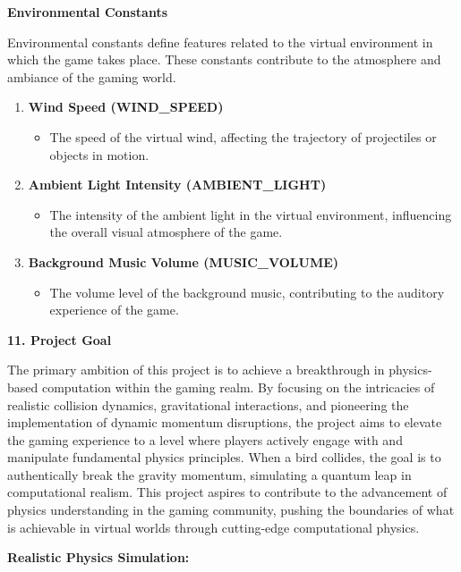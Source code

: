 \documentclass[
]{article}
\begin{document}
\textbf{Environmental Constants}

Environmental constants define features related to the virtual
environment in which the game takes place. These constants contribute to
the atmosphere and ambiance of the gaming world.

\begin{enumerate}
\def\labelenumi{\arabic{enumi}.}
\item
  \textbf{Wind Speed (WIND\_SPEED)}

  \begin{itemize}
  \item
    The speed of the virtual wind, affecting the trajectory of
    projectiles or objects in motion.
  \end{itemize}
\item
  \textbf{Ambient Light Intensity (AMBIENT\_LIGHT)}

  \begin{itemize}
  \item
    The intensity of the ambient light in the virtual environment,
    influencing the overall visual atmosphere of the game.
  \end{itemize}
\item
  \textbf{Background Music Volume (MUSIC\_VOLUME)}

  \begin{itemize}
  \item
    The volume level of the background music, contributing to the
    auditory experience of the game.
  \end{itemize}
\end{enumerate}

\textbf{11. Project Goal}

The primary ambition of this project is to achieve a breakthrough in
physics-based computation within the gaming realm. By focusing on the
intricacies of realistic collision dynamics, gravitational interactions,
and pioneering the implementation of dynamic momentum disruptions, the
project aims to elevate the gaming experience to a level where players
actively engage with and manipulate fundamental physics principles. When
a bird collides, the goal is to authentically break the gravity
momentum, simulating a quantum leap in computational realism. This
project aspires to contribute to the advancement of physics
understanding in the gaming community, pushing the boundaries of what is
achievable in virtual worlds through cutting-edge computational physics.

\textbf{Realistic Physics Simulation:}
\end{document}

